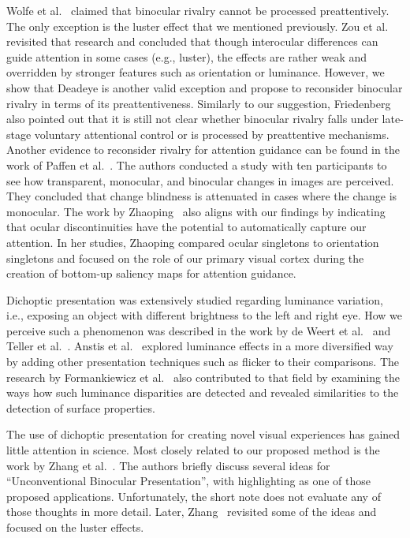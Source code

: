 \documentclass[journal]{vgtc}                %
\begin{document}
Wolfe et al.~\cite{wolfe1988binocularity} claimed that binocular rivalry cannot be processed preattentively. The only exception is the luster effect that we mentioned previously. Zou et al.~\cite{zou2017binocularity} revisited that research and concluded that though interocular differences can guide attention in some cases (e.g., luster), the effects are rather weak and overridden by stronger features such as orientation or luminance. However, we show that Deadeye is another valid exception and propose to reconsider binocular rivalry in terms of its preattentiveness. Similarly to our suggestion, Friedenberg~\cite{friedenberg2012visual} also pointed out that it is still not clear whether binocular rivalry falls under late-stage voluntary attentional control or is processed by preattentive mechanisms. Another evidence to reconsider rivalry for attention guidance can be found in the work of Paffen et al.~\cite{paffen2012interocular}. The authors conducted a study with ten participants to see how transparent, monocular, and binocular changes in images are perceived. They concluded that change blindness is attenuated in cases where the change is monocular. The work by Zhaoping~\cite{zhaoping2008attention} also aligns with our findings by indicating that ocular discontinuities have the potential to automatically capture our attention. In her studies, Zhaoping compared ocular singletons to orientation singletons and focused on the role of our primary visual cortex during the creation of bottom-up saliency maps for attention guidance.

Dichoptic presentation was extensively studied regarding luminance variation, i.e., exposing an object with different brightness to the left and right eye. How we perceive such a phenomenon was described in the work by de Weert et al.~\cite{de1974binocular} and Teller et al.~\cite{teller1967brightnesses}. Anstis et al.~\cite{anstis1998nonlinear} explored luminance effects in a more diversified way by adding other presentation techniques such as flicker to their comparisons. The research by Formankiewicz et al.~\cite{formankiewicz2009psychophysics} also contributed to that field by examining the ways how such luminance disparities are detected and revealed similarities to the detection of surface properties.





  
The use of dichoptic presentation for creating novel visual experiences has gained little attention in science. Most closely related to our proposed method is the work by Zhang et al.~\cite{Zhang:2012:BSE}. The authors briefly discuss several ideas for ``Unconventional Binocular Presentation'', with highlighting as one of those proposed applications. Unfortunately, the short note does not evaluate any of those thoughts in more detail. Later, Zhang~\cite{Zhang:2014:SBE} revisited some of the ideas and focused on the luster effects.
\end{document}
